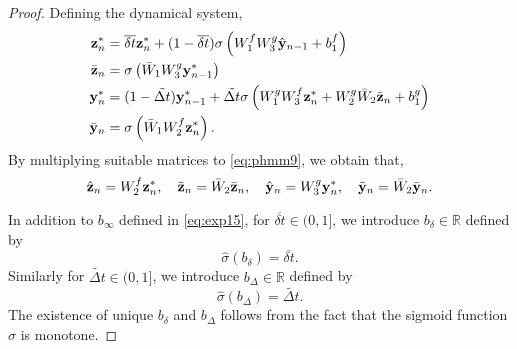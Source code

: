 \documentclass{article} \usepackage{iclr2022_conference,times}
\newcommand{\by}{{\bf y}}
\newcommand{\bz}{{\bf z}}
\newcommand{\R}{{\mathbb R}}
\newcommand{\Dt}{{\Delta t}}
\begin{document}
\begin{proof}
Defining the dynamical system,
\begin{equation}
    \label{eq:phmm9}
    \begin{aligned}
    \bz^{\ast}_n &= \overline{\delta t}\bz^{\ast}_n + (1-\overline{\delta t})\sigma\left(W^f_1W^g_3 \hat{\by}_{n-1} + b^f_1 \right) \\
    \bar{\bz}_n &= \sigma\left(\bar{W}_1 W^g_3\by^{\ast}_{n-1} \right) \\
    \by^{\ast}_n &= (1-\tilde{\Dt})\by^{\ast}_{n-1} +\tilde{\Dt} \sigma\left(W^g_1 W^f_3 \bz^{\ast}_{n} + W^g_2 \bar{W}_2 \tilde{\bz}_{n} + b^g_1 \right)  \\
    \bar{\by}_n &= \sigma\left(\bar{W}_1 W^f_2 \bz^{\ast}_{n} \right) .
    \end{aligned}
\end{equation}
By multiplying suitable matrices to \eqref{eq:phmm9}, we obtain that,
\begin{equation}
    \label{eq:phmm10}
    \hat{\bz}_n = W^f_2\bz_n^{\ast}, \quad 
    \tilde{\bz}_n = \bar{W}_2 \bar{\bz}_n, \quad 
    \hat{\by}_n = W^g_3\by_n^{\ast}, \quad 
    \tilde{\by}_n = \bar{W}_2 \bar{\by}_n.
\end{equation}

In addition to $b_{\infty}$ defined in \eqref{eq:exp15}, for $\overline{\delta t} \in (0,1]$, we introduce $b_{\delta} \in \R$ defined by 
\begin{equation}
    \label{eq:phmm11}
    \hat{\sigma}(b_{\delta}) = \overline{\delta t}.
\end{equation}
Similarly for $\tilde{\Dt} \in (0,1]$, we introduce $b_{\Delta} \in \R$ defined by 
\begin{equation}
    \label{eq:phmm011}
    \hat{\sigma}(b_{\Delta}) = \tilde{\Dt}.
\end{equation}
The existence of unique $b_{\delta}$ and $b_{\Delta}$ follows from the fact that the sigmoid function $\hat{\sigma}$ is monotone.


\end{proof}
\end{document}
